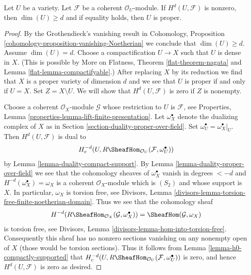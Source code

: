 \begin{lemma}
\label{lemma-lichtenbaum}
Let $U$ be a variety. Let $\mathcal{F}$ be a coherent $\mathcal{O}_U$-module.
If $H^d(U, \mathcal{F})$ is nonzero, then $\dim(U) \geq d$ and if
equality holds, then $U$ is proper.
\end{lemma}

\begin{proof}
By the Grothendieck's vanishing result in
Cohomology, Proposition \ref{cohomology-proposition-vanishing-Noetherian}
we conclude that $\dim(U) \geq d$.
Assume $\dim(U) = d$. Choose a compactification $U \to X$
such that $U$ is dense in $X$. (This is possible by
More on Flatness, Theorem \ref{flat-theorem-nagata} and
Lemma \ref{flat-lemma-compactifyable}.) After replacing $X$ by its
reduction we find that $X$ is a proper variety of dimension $d$
and we see that $U$ is proper if and only if $U = X$.
Set $Z = X \setminus U$. We will show that $H^d(U, \mathcal{F})$
is zero if $Z$ is nonempty.

\medskip\noindent
Choose a coherent $\mathcal{O}_X$-module
$\mathcal{G}$ whose restriction to $U$ is $\mathcal{F}$, see
Properties, Lemma \ref{properties-lemma-lift-finite-presentation}.
Let $\omega_X^\bullet$ denote the dualizing complex of $X$ as in
Section \ref{section-duality-proper-over-field}.
Set $\omega_U^\bullet = \omega_X^\bullet|_U$.
Then $H^d(U, \mathcal{F})$ is dual to
$$
H^{-d}_c(U, R\SheafHom_{\mathcal{O}_U}(\mathcal{F}, \omega_U^\bullet))
$$
by Lemma \ref{lemma-duality-compact-support}. By
Lemma \ref{lemma-duality-proper-over-field} we see that
the cohomology sheaves of $\omega_X^\bullet$ vanish in degrees $< -d$
and $H^{-d}(\omega_X^\bullet) = \omega_X$ is a coherent
$\mathcal{O}_X$-module which is $(S_2)$ and whose support is $X$.
In particular, $\omega_X$ is torsion free, see
Divisors, Lemma \ref{divisors-lemma-torsion-free-finite-noetherian-domain}.
Thus we see that the cohomology sheaf
$$
H^{-d}(R\SheafHom_{\mathcal{O}_X}(\mathcal{G}, \omega_X^\bullet)) =
\SheafHom(\mathcal{G}, \omega_X)
$$
is torsion free, see
Divisors, Lemma \ref{divisors-lemma-hom-into-torsion-free}.
Consequently this sheaf has no nonzero sections vanishing
on any nonempty open of $X$ (those would be torsion sections).
Thus it follows from Lemma \ref{lemma-h0-compactly-supported} that
$H^{-d}_c(U, R\SheafHom_{\mathcal{O}_U}(\mathcal{F}, \omega_U^\bullet))$
is zero, and hence $H^d(U, \mathcal{F})$ is zero as desired.
\end{proof}